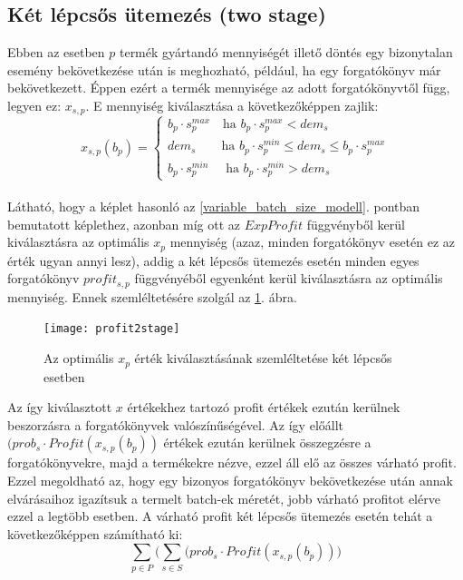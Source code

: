 \subsection{Két lépcsős ütemezés (two stage)} \label{TwoStage}
Ebben az esetben $p$ termék gyártandó mennyiségét illető döntés egy bizonytalan esemény bekövetkezése után is meghozható, például, ha egy forgatókönyv már bekövetkezett.
Éppen ezért a termék mennyisége az adott forgatókönyvtől függ, legyen ez: $x_{s,p}$. E mennyiség kiválasztása a következőképpen zajlik:
\begin{equation*}
x_{s,p}(b_p)= \begin{cases}
            b_p \cdot s_p^{max} \quad \text{ha } b_p \cdot s_p^{max}<dem_{s}\\
            dem_{s} \qquad \text{ha } b_p \cdot s_p^{min} \leq dem_{s} \leq b_p \cdot s_p^{max}\\
            b_p \cdot s_p^{min} \quad \text{ ha } b_p \cdot s_p^{min}>dem_{s}
       \end{cases}       
\end{equation*}\\
Látható, hogy a képlet hasonló az \ref{variable_batch_size_modell}. pontban bemutatott képlethez, azonban míg ott  az $ExpProfit$ függvényből kerül kiválasztásra az optimális $x_p$ mennyiség (azaz, minden forgatókönyv esetén ez az érték ugyan annyi lesz), addig a két lépcsős ütemezés esetén minden egyes forgatókönyv $profit_{s,p}$ függvényéből egyenként kerül kiválasztásra az optimális mennyiség.
Ennek szemléltetésére szolgál az \ref{profit_2stage}. ábra.
\begin{figure}[H]
\begin{center}
\texttt{[image: profit2stage]}
\caption{Az optimális $x_p$ érték kiválasztásának szemléltetése két lépcsős esetben}
\label{profit_2stage}
\end{center}
\end{figure}
Az így kiválasztott $x$ értékekhez tartozó profit értékek ezután kerülnek beszorzásra a forgatókönyvek valószínűségével.
Az így előállt $(prob_s \cdot Profit(x_{s,p}(b_p))$ értékek ezután kerülnek összegzésre a forgatókönyvekre, majd a termékekre nézve, ezzel áll elő az összes várható profit.
Ezzel megoldható az, hogy egy bizonyos forgatókönyv bekövetkezése után annak elvárásaihoz igazítsuk a termelt batch-ek méretét, jobb várható profitot elérve ezzel a legtöbb esetben.
A várható profit két lépcsős ütemezés esetén tehát a következőképpen számítható ki:
$$\sum_{p \in P} \bigg( \sum_{s \in S}(prob_s \cdot Profit(x_{s,p}(b_p)) \bigg)$$ 
